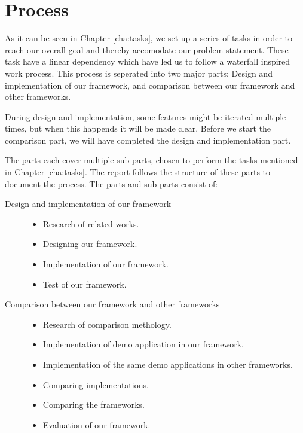 \section{Process}
As it can be seen in Chapter \ref{cha:tasks}, we set up a series of tasks in order to reach our overall goal and thereby accomodate our problem statement. These task have a linear dependency which have led us to follow a waterfall inspired work process. This process is seperated into two major parts; Design and implementation of our framework, and comparison between our framework and other frameworks. 

During design and implementation, some features might be iterated multiple times, but when this happends it will be made clear. Before we start the comparison part, we will have completed the design and implementation part.

The parts each cover multiple sub parts, chosen to perform the tasks mentioned in Chapter \ref{cha:tasks}. The report follows the structure of these parts to document the process. The parts and sub parts consist of:
\begin{description}
\item[Design and implementation of our framework] \hfill
\begin{itemize} 
\item Research of related works.
\item Designing our framework.
\item Implementation of our framework.
\item Test of our framework.
\end{itemize}
\item[Comparison between our framework and other frameworks] \hfill
\begin{itemize} 
\item Research of comparison methology.
\item Implementation of demo application in our framework.
\item Implementation of the same demo applications in other frameworks.
\item Comparing implementations.
\item Comparing the frameworks.
\item Evaluation of our framework.
\end{itemize}
\end{description}
